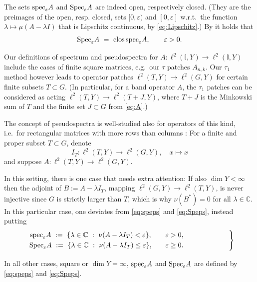 \documentclass{article}
\newcommand\C{{\mathbb C}}
\newcommand\I{{\mathbb I}}
\newcommand\eps{{\varepsilon}}
\newcommand\speps{{\rm spec}_\eps}
\newcommand\Speps{{\rm Spec}_\eps}
\newcommand\clos{{\rm clos\,}}
\numberwithin{equation}{section}   %
\numberwithin{figure}{section}  %
\begin{document}
The sets $\speps A$ and $\Speps A$ are indeed open, respectively closed. (They are the preimages of the open, resp. closed, sets $[0,\eps)$ and $[0,\eps]$ w.r.t.~the function $\lambda\mapsto \mu(A-\lambda I)$ that is Lipschitz continuous, by \eqref{eq:Lipschitz}.) By \cite{Globevnik74,Globevnik76,Shargo08,Shargo09} it holds that
\begin{equation} \label{eq:closspeps}
\Speps A\ =\ \clos\speps A,\qquad\eps>0.
\end{equation}


Our definitions of spectrum and pseudospectra for $A:\ell^2(\I,Y)\to\ell^2(\I,Y)$ include the cases of finite square matrices, e.g.~our $\tau$ patches $A_{n,k}$. Our $\tau_1$ method however leads to operator patches $\ell^2(T,Y)\to\ell^2(G,Y)$ for certain finite subsets $T\subset G$. 
(In particular, for a band operator $A$, the $\tau_1$ patches can be considered as acting $\ell^2(T,Y)\to\ell^2(T+J,Y)$, where $T+J$ is the Minkowski sum of $T$ and the finite set $J\subset G$ from \eqref{eq:A}.)

The concept of pseudospectra is well-studied also for operators of this kind, i.e.~for rectangular matrices with more rows than columns \cite{WrightTrefethen,TrefEmbBook}:
%
For a finite and proper subset $T\subset G$, denote
\[
I_T:\ell^2(T,Y)\to \ell^2(G,Y),\quad x\mapsto x
\]
and suppose $A:\ell^2(T,Y)\to\ell^2(G,Y)$.

In this setting, there is one case that needs extra attention: If also $\dim Y<\infty$ then the adjoint of $B:=A-\lambda I_T$, mapping $\ell^2(G,Y)\to\ell^2(T,Y)$, is never injective since $G$ is strictly larger than $T$, which is why $\nu(B^*)=0$ for all $\lambda\in\C$. In this particular case, one deviates from \eqref{eq:speps} and \eqref{eq:Speps}, instead putting
\begin{equation} \label{eq:speps.rect}
\left.\begin{array}{ccc}
\speps A\ :=\ \{\lambda\in\C\ :\ \nu(A-\lambda I_T)<\eps\},&&\eps>0,\\[1mm]
\Speps A\ :=\ \{\lambda\in\C\ :\ \nu(A-\lambda I_T)\le\eps\},&&\eps\ge 0.
\end{array}
\qquad\qquad\qquad\right\}
\end{equation}

In all other cases, square or $\dim Y=\infty$, $\speps A$ and $\Speps A$ are defined by \eqref{eq:speps} and \eqref{eq:Speps}.

\end{document}
